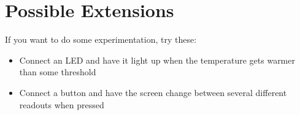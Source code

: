 \section{Possible Extensions}
If you want to do some experimentation, try these:

\begin{itemize}
    \item Connect an LED and have it light up when the temperature gets warmer than some threshold
    \item Connect a button and have the screen change between several different readouts when pressed
\end{itemize}
